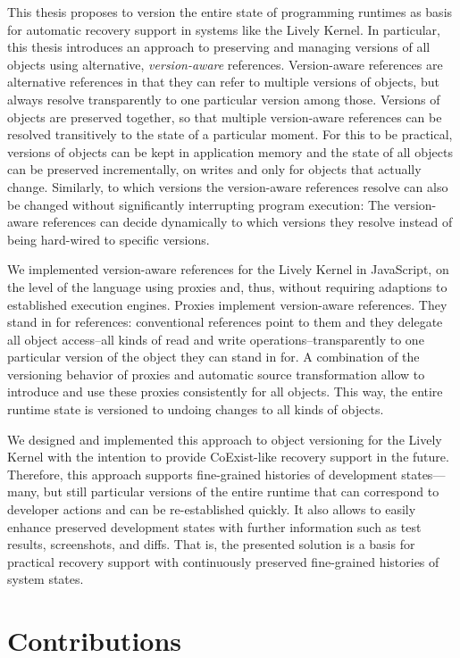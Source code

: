 This thesis proposes to version the entire state of programming runtimes as basis for automatic recovery support in systems like the Lively Kernel.
In particular, this thesis introduces an approach to preserving and managing versions of all objects using alternative, \emph{version-aware} references.
Version-aware references are alternative references in that they can refer to multiple versions of objects, but always resolve transparently to one particular version among those.
Versions of objects are preserved together, so that multiple version-aware references can be resolved transitively to the state of a particular moment.
For this to be practical, versions of objects can be kept in application memory and the state of all objects can be preserved incrementally, on writes and only for objects that actually change.
Similarly, to which versions the version-aware references resolve can also be changed without significantly interrupting program execution:
The version-aware references can decide dynamically to which versions they resolve instead of being hard-wired to specific versions.

We implemented version-aware references for the Lively Kernel in JavaScript, on the level of the language using proxies and, thus, without requiring adaptions to established execution engines.
Proxies implement version-aware references.
They stand in for references: conventional references point to them and they delegate all object access--all kinds of read and write operations--transparently to one particular version of the object they can stand in for.
A combination of the versioning behavior of proxies and automatic source transformation allow to introduce and use these proxies consistently for all objects.
This way, the entire runtime state is versioned to undoing changes to all kinds of objects.

We designed and implemented this approach to object versioning for the Lively Kernel with the intention to provide CoExist-like recovery support in the future.
Therefore, this approach supports fine-grained histories of development states---many, but still particular versions of the entire runtime that can correspond to developer actions and can be re-established quickly.
It also allows to easily enhance preserved development states with further information such as test results, screenshots, and diffs.
That is, the presented solution is a basis for practical recovery support with continuously preserved fine-grained histories of system states.

\section{Contributions}

